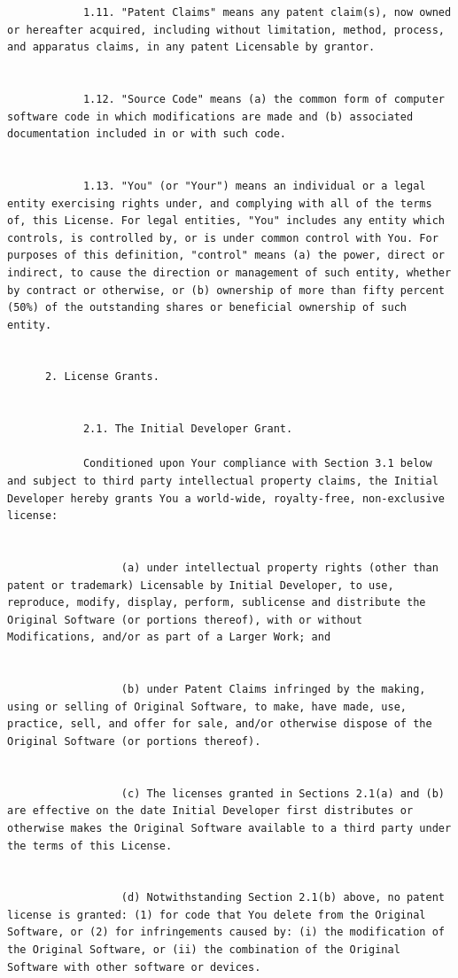 \documentclass[10pt, headsepline,DIV14,BCOR0.5cm]{scrreprt}
\begin{document}
\begin{lstlisting}
            1.11. "Patent Claims" means any patent claim(s), now owned or hereafter acquired, including without limitation, method, process, and apparatus claims, in any patent Licensable by grantor.
            

            1.12. "Source Code" means (a) the common form of computer software code in which modifications are made and (b) associated documentation included in or with such code.
            

            1.13. "You" (or "Your") means an individual or a legal entity exercising rights under, and complying with all of the terms of, this License. For legal entities, "You" includes any entity which controls, is controlled by, or is under common control with You. For purposes of this definition, "control" means (a) the power, direct or indirect, to cause the direction or management of such entity, whether by contract or otherwise, or (b) ownership of more than fifty percent (50%) of the outstanding shares or beneficial ownership of such entity.
    

      2. License Grants.
            

            2.1. The Initial Developer Grant.

            Conditioned upon Your compliance with Section 3.1 below and subject to third party intellectual property claims, the Initial Developer hereby grants You a world-wide, royalty-free, non-exclusive license:
                  

                  (a) under intellectual property rights (other than patent or trademark) Licensable by Initial Developer, to use, reproduce, modify, display, perform, sublicense and distribute the Original Software (or portions thereof), with or without Modifications, and/or as part of a Larger Work; and
                  

                  (b) under Patent Claims infringed by the making, using or selling of Original Software, to make, have made, use, practice, sell, and offer for sale, and/or otherwise dispose of the Original Software (or portions thereof).
                  

                  (c) The licenses granted in Sections 2.1(a) and (b) are effective on the date Initial Developer first distributes or otherwise makes the Original Software available to a third party under the terms of this License.
                  

                  (d) Notwithstanding Section 2.1(b) above, no patent license is granted: (1) for code that You delete from the Original Software, or (2) for infringements caused by: (i) the modification of the Original Software, or (ii) the combination of the Original Software with other software or devices.
            


\end{lstlisting}
\end{document}
